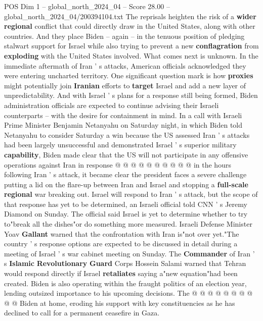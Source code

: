 \begin{textsample}{POS Dim 1 – global\_north\_2024\_04 – Score 28.00 – global\_north\_2024\_04/200394104.txt}  \label{ex:f1_pos_157}
The reprisals heighten the risk of a \textbf{wider} \textbf{regional} conflict that could directly draw in the United States, along with other countries.
And they place Biden -- again -- in the tenuous position of pledging stalwart support for Israel while also trying to prevent a new \textbf{conflagration} from \textbf{exploding} with the United States involved.
What comes next is unknown.
In the immediate aftermath of Iran ' s attacks, American officials acknowledged they were entering uncharted territory.
One significant question mark is how \textbf{proxies} might potentially join \textbf{Iranian} efforts to \textbf{target} Israel and add a new layer of unpredictability.
And with Israel ' s plans for a response still being formed, Biden administration officials are expected to continue advising their Israeli counterparts -- with the desire for containment in mind.
In a call with Israeli Prime Minister Benjamin Netanyahu on Saturday night, in which Biden told Netanyahu to consider Saturday a win because the US assessed Iran ' s attacks had been largely unsuccessful and demonstrated Israel ' s superior military \textbf{capability}, Biden made clear that the US will not participate in any offensive operations against Iran in response @ @ @ @ @ @ @ @ @ @ in the hours following Iran ' s attack, it became clear the president faces a severe challenge putting a lid on the flare-up between Iran and Israel and stopping a \textbf{full-scale} \textbf{regional} war breaking out.
Israel will respond to Iran ' s attack, but the scope of that response has yet to be determined, an Israeli official told CNN ' s Jeremy Diamond on Sunday.
The official said Israel is yet to determine whether to try to"break all the dishes"or do something more measured.
Israeli Defense Minister Yoav \textbf{Gallant} warned that the confrontation with Iran is"not over yet."The country ' s response options are expected to be discussed in detail during a meeting of Israel ' s war cabinet meeting on Sunday.
The \textbf{Commander} of Iran ' s \textbf{Islamic} \textbf{Revolutionary} \textbf{Guard} Corps Hossein Salami warned that Tehran would respond directly if Israel \textbf{retaliates} saying a"new equation"had been created.
Biden is also operating within the fraught politics of an election year, lending outsized importance to his upcoming decisions.
The @ @ @ @ @ @ @ @ @ @ Biden at home, eroding his support with key constituencies as he has declined to call for a permanent ceasefire in Gaza.

\end{textsample}
